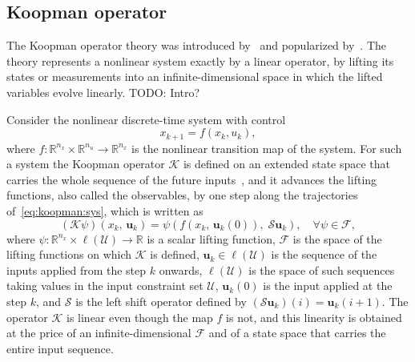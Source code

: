 \documentclass[preprint,12pt,authoryear]{elsarticle}
\theoremstyle{remark}
\newcommand{\todo}[1]{{{\color{red} TODO: #1	}} }
\begin{document}
\subsection{Koopman operator}
The Koopman operator theory was introduced by~\cite{koopman1931hamiltonian} and popularized by~\cite{mezic2005spectral}. The theory represents a nonlinear system exactly by a linear operator, by lifting its states or measurements into an infinite-dimensional space in which the lifted variables evolve linearly.
\todo{Intro?}

Consider the nonlinear discrete-time system with control
\begin{equation}
  \label{eq:koopman:sys}
  x_{k+1} = f(x_k, u_k),
\end{equation}
where $f : \mathbb{R}^{n_x} \times \mathbb{R}^{n_u} \to \mathbb{R}^{n_x}$ is the nonlinear transition map of the system. For such a system the Koopman operator $\mathcal{K}$ is defined on an extended state space that carries the whole sequence of the future inputs~\citep{korda2018linear}, and it advances the lifting functions, also called the observables, by one step along the trajectories of~\eqref{eq:koopman:sys}, which is written as
\begin{equation}
  \label{eq:koopman:def}
  \left( \mathcal{K} \psi \right)(x_k,\, \mathbf{u}_k) = \psi\!\left( f\!\left(x_k,\, \mathbf{u}_k(0)\right),\; \mathcal{S}\mathbf{u}_k \right), \quad \forall \psi \in \mathcal{F},
\end{equation}
where $\psi : \mathbb{R}^{n_x} \times \ell(\mathcal{U}) \to \mathbb{R}$ is a scalar lifting function, $\mathcal{F}$ is the space of the lifting functions on which $\mathcal{K}$ is defined, $\mathbf{u}_k \in \ell(\mathcal{U})$ is the sequence of the inputs applied from the step $k$ onwards, $\ell(\mathcal{U})$ is the space of such sequences taking values in the input constraint set $\mathcal{U}$, $\mathbf{u}_k(0)$ is the input applied at the step $k$, and $\mathcal{S}$ is the left shift operator defined by $(\mathcal{S}\mathbf{u}_k)(i) = \mathbf{u}_k(i+1)$. The operator $\mathcal{K}$ is linear even though the map $f$ is not, and this linearity is obtained at the price of an infinite-dimensional $\mathcal{F}$ and of a state space that carries the entire input sequence.
\end{document}
